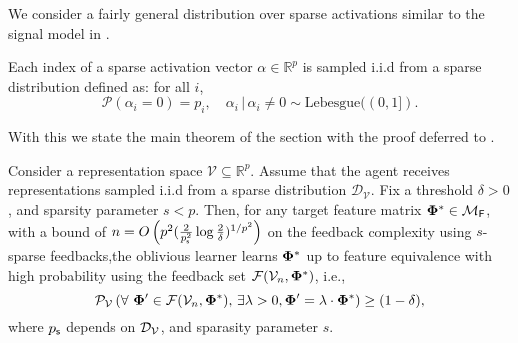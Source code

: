 We consider a fairly general distribution over sparse activations similar to the signal model in \cite{bachsparse}.

\begin{assumption}\label{ass: sparse}
    Each index of a sparse activation vector \( \alpha \in \mathbb{R}^p \) is sampled i.i.d from a sparse distribution defined as: for all \( i \),
    \[
        \mathcal{P}(\alpha_i = 0) = p_i, \quad \alpha_i \, | \, \alpha_i \neq 0 \sim \text{Lebesgue}((0,1]).
    \]
\end{assumption}
With this we state the main theorem of the section with the proof deferred to .
\begin{theorem}\label{thm: samplingsparse} Consider a representation space \( \mathcal{V} \subseteq \mathbb{R}^p \).
    Assume that the agent receives representations sampled i.i.d from a sparse distribution \( \mathcal{D}_{\mathcal{V}} \). Fix a threshold \( \delta > 0 \), and sparsity parameter \( s < p \). Then, for any target feature matrix \( \pphi^* \in \mathcal{M}_{\sf{F}} \), with a bound of $n = O\paren{p^2(\frac{2}{p_{\sf{s}}^2} \log \frac{2}{\delta})^{1/p^2}}$
    on the feedback complexity using \( s \)-sparse feedbacks,the oblivious learner learns \( \pphi^* \) up to feature equivalence with high probability using the feedback set \( \mathcal{F}(\mathcal{V}_n,\pphi^*) \), i.e.,
    \[
        \mathcal{P}_{\mathcal{V}} \left( \forall\,\, \pphi' \in \mathcal{F}(\mathcal{V}_n,\pphi^*),\, \exists \lambda > 0, \pphi' = \lambda \cdot \pphi^* \right) \geq (1 - \delta),
    \]
    where $p_{\sf{s}}$ depends on $\cD_\cV$, and sparasity parameter $s$.
\end{theorem}
